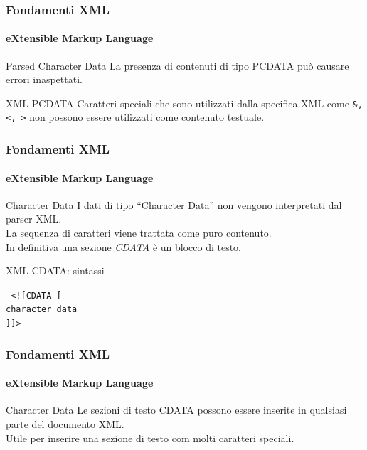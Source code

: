 \begin{frame}
    \frametitle{Fondamenti XML}
    \framesubtitle{eXtensible Markup Language}
    \addtocounter{nframe}{1}

	\begin{block}{Parsed Character Data}
		La presenza di contenuti di tipo PCDATA può causare errori inaspettati.
	\end{block}

	\begin{block}{XML PCDATA}
		Caratteri speciali che sono utilizzati dalla specifica XML come \texttt{\&, <, >} non possono essere utilizzati come contenuto testuale.
	\end{block}

\end{frame}



\begin{frame}
    \frametitle{Fondamenti XML}
    \framesubtitle{eXtensible Markup Language}
    \addtocounter{nframe}{1}

	\begin{block}{Character Data}
		I dati di tipo ``Character Data'' non vengono interpretati dal parser XML.
		\\ La sequenza di caratteri viene trattata come puro contenuto.
		\\In definitiva una sezione \textit{CDATA} è un blocco di testo.
	\end{block}

	\begin{block}{XML CDATA: sintassi}
		\begin{center}
			\texttt{
				 <![CDATA [
					 \\character data
					 \\]]>
			}
		\end{center}
	\end{block}

\end{frame}



\begin{frame}
    \frametitle{Fondamenti XML}
    \framesubtitle{eXtensible Markup Language}
    \addtocounter{nframe}{1}

	\begin{block}{Character Data}
		Le sezioni di testo CDATA possono essere inserite in qualsiasi parte del documento XML.
		\\ Utile per inserire una sezione di testo com molti caratteri speciali.
	\end{block}

\end{frame}

